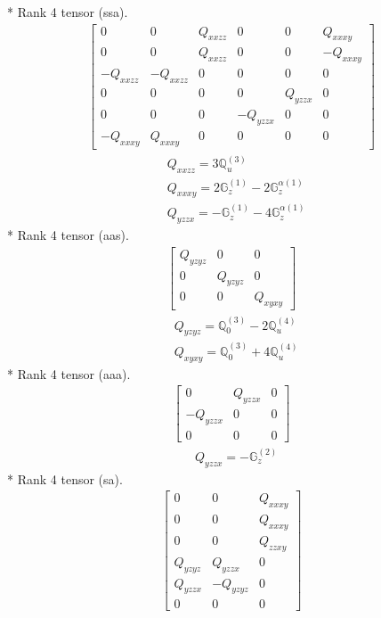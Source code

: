 \documentclass[fleqn,8pt,landscape]{jsarticle}
\begin{document}
* Rank 4 tensor (ssa).
\begin{align*}
\begin{bmatrix} 0 & 0 & Q_{xxzz} & 0 & 0 & Q_{xxxy} \\ 0 & 0 & Q_{xxzz} & 0 & 0 & - Q_{xxxy} \\ - Q_{xxzz} & - Q_{xxzz} & 0 & 0 & 0 & 0 \\ 0 & 0 & 0 & 0 & Q_{yzzx} & 0 \\ 0 & 0 & 0 & - Q_{yzzx} & 0 & 0 \\ - Q_{xxxy} & Q_{xxxy} & 0 & 0 & 0 & 0 \end{bmatrix}
\end{align*}
\begin{align*}
& Q_{xxzz} = 3 \mathbb{Q}_{u}^{(3)} \\
& Q_{xxxy} = 2 \mathbb{G}_{z}^{(1)} - 2 \mathbb{G}_{z}^{\alpha(1)} \\
& Q_{yzzx} = - \mathbb{G}_{z}^{(1)} - 4 \mathbb{G}_{z}^{\alpha(1)}
\end{align*}
* Rank 4 tensor (aas).
\begin{align*}
\begin{bmatrix} Q_{yzyz} & 0 & 0 \\ 0 & Q_{yzyz} & 0 \\ 0 & 0 & Q_{xyxy} \end{bmatrix}
\end{align*}
\begin{align*}
& Q_{yzyz} = \mathbb{Q}_{0}^{(3)} - 2 \mathbb{Q}_{u}^{(4)} \\
& Q_{xyxy} = \mathbb{Q}_{0}^{(3)} + 4 \mathbb{Q}_{u}^{(4)}
\end{align*}
* Rank 4 tensor (aaa).
\begin{align*}
\begin{bmatrix} 0 & Q_{yzzx} & 0 \\ - Q_{yzzx} & 0 & 0 \\ 0 & 0 & 0 \end{bmatrix}
\end{align*}
\begin{align*}
& Q_{yzzx} = - \mathbb{G}_{z}^{(2)}
\end{align*}
* Rank 4 tensor (sa).
\begin{align*}
\begin{bmatrix} 0 & 0 & Q_{xxxy} \\ 0 & 0 & Q_{xxxy} \\ 0 & 0 & Q_{zzxy} \\ Q_{yzyz} & Q_{yzzx} & 0 \\ Q_{yzzx} & - Q_{yzyz} & 0 \\ 0 & 0 & 0 \end{bmatrix}
\end{align*}
\end{document}
